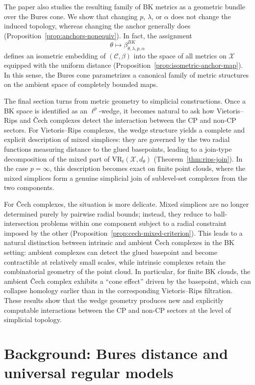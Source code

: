 \documentclass[11pt]{amsart}
\theoremstyle{definition}
\theoremstyle{remark}
\newcommand{\1}{\mathbbm{1}}
\newcommand{\VR}{\mathrm{VR}}
\begin{document}
The paper also studies the resulting family of BK metrics as a geometric bundle
over the Bures cone. We show that changing $p$, $\lambda$, or $\alpha$ does not
change the induced topology, whereas changing the anchor generally does (Proposition~\ref{prop:anchors-nonequiv}). In
fact, the assignment
\[
\theta\longmapsto \beta^{BK}_{\theta,\lambda,p,\alpha}
\]
defines an isometric embedding of $(\mathcal C,\beta)$ into the space of all
metrics on $\mathcal X$ equipped with the uniform distance (Proposition~\ref{prop:isometric-anchor-map}). In this sense, the
Bures cone parametrizes a canonical family of metric structures on the ambient
space of completely bounded maps.

The final section turns from metric geometry to simplicial constructions. Once a
BK space is identified as an $\ell^p$-wedge, it becomes natural to ask how
Vietoris--Rips and \v{C}ech complexes detect the interaction between the CP and
non-CP sectors. For Vietoris--Rips complexes, the wedge structure yields a
complete and explicit description of mixed simplices: they are governed by the
two radial functions measuring distance to the glued basepoints, leading to a
join-type decomposition of the mixed part of $\VR_t(\mathcal X,d_\theta)$
(Theorem~\ref{thm:rips-join}). In the case $p=\infty$, this description becomes
exact on finite point clouds, where the mixed simplices form a genuine simplicial
join of sublevel-set complexes from the two components.

For \v{C}ech complexes, the situation is more delicate. Mixed simplices are no
longer determined purely by pairwise radial bounds; instead, they reduce to
ball-intersection problems within one component subject to a radial constraint
imposed by the other (Proposition~\ref{prop:cech-mixed-criterion}). This leads to
a natural distinction between intrinsic and ambient \v{C}ech complexes in the BK
setting: ambient complexes can detect the glued basepoint and become
contractible at relatively small scales, while intrinsic complexes retain the
combinatorial geometry of the point cloud. In particular, for finite BK clouds,
the ambient \v{C}ech complex exhibits a ``cone effect'' driven by the basepoint,
which can collapse homology earlier than in the corresponding Vietoris--Rips
filtration. These results show that the wedge geometry produces new and
explicitly computable interactions between the CP and non-CP sectors at the
level of simplicial topology.


\section{Background: Bures distance and  universal regular models}
\end{document}
